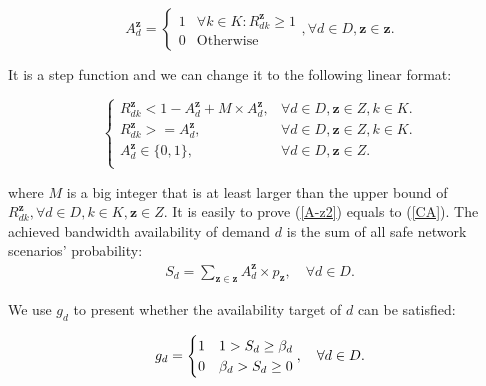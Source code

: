\documentclass[sigconf]{acmart}
\begin{document}
\begin{appendices}
\begin{equation}
A_d^{\mathbf{z}}=
\begin{cases}
1 &\text{$\forall k \in K:R_{dk}^{\mathbf{z}}\ge 1$}\\
0&\text{Otherwise}
\end{cases}
,\forall  d \in D, \mathbf{z}\in \mathbf{z}.
\label{CA}
\end{equation}



It is a step function and we can change it to the following linear format:
%
 


\begin{equation}
\begin{cases}
R_{dk}^{\mathbf{z}} < 1- A_d^{\mathbf{z}}+M\times A_d^{\mathbf{z}},&{\forall d \in D, \mathbf{z} \in Z, k\in K.} \\
R_{dk}^{\mathbf{z}}>=A_d^{\mathbf{z}},&{\forall d \in D, \mathbf{z} \in Z, k\in K.} \\
A_d^{\mathbf{z}} \in\{0,1\},&{\forall d \in D, \mathbf{z} \in Z.} \\
\end{cases}
\label{A-z2}
\end{equation}

where $M$ is a big integer that is at least larger than the upper bound of $R_{dk}^{\mathbf{z}},\forall d \in D, k\in K,\mathbf{z} \in Z$.
It is easily to  prove  (\ref{A-z2}) equals to  (\ref{CA}).
The achieved bandwidth availability of demand $d$ is the sum of all safe network scenarios' probability: 
 \begin{eqnarray} \label{S}
S_d=\sum_{\mathbf{z}\in \mathbf{z}}A_d^{\mathbf{z}}\times p_{\mathbf{z}},  \quad \forall  d \in D.
\end{eqnarray}

We use $g_d$ to present whether the availability target of $d$ can be satisfied: 

\begin{equation}
 g_d=
\begin{cases}
1 &\text{$1 >S_d \ge \beta_{d}$}\\
0 &\text{$ \beta_{d} >S_d\ge 0 $}
\end{cases},
\ \ \ \forall  d \in D.
\label{availability4}
\end{equation}


\end{appendices}
\end{document}
